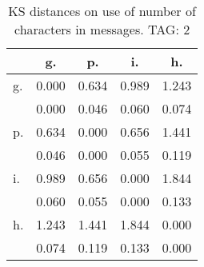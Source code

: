 \begin{table}[h!]
\begin{center}
\begin{tabular}{| l | c | c | c | c |}\hline
 & g. & p. & i. & h. \\\hline
g. & 0.000  & 0.634  & 0.989  & 1.243 \\\hline
 & 0.000  & 0.046  & 0.060  & 0.074 \\\hline
p. & 0.634  & 0.000  & 0.656  & 1.441 \\\hline
 & 0.046  & 0.000  & 0.055  & 0.119 \\\hline
i. & 0.989  & 0.656  & 0.000  & 1.844 \\\hline
 & 0.060  & 0.055  & 0.000  & 0.133 \\\hline
h. & 1.243  & 1.441  & 1.844  & 0.000 \\\hline
 & 0.074  & 0.119  & 0.133  & 0.000 \\\hline
\end{tabular}
\caption{KS distances on use of number of characters in messages. TAG: 2}
\end{center}
\end{table}